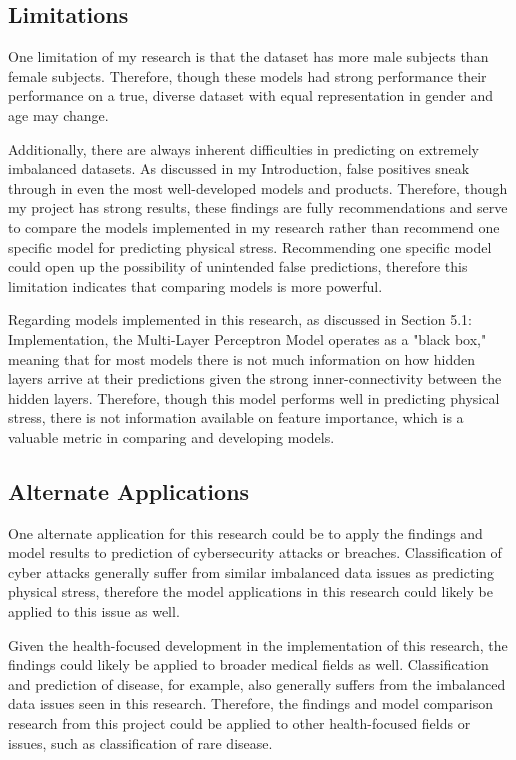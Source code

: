 \documentclass{article}
\begin{document}
\subsection{Limitations}

One limitation of my research is that the dataset has more male subjects than female subjects. Therefore, though these models had strong performance their performance on a true, diverse dataset with equal representation in gender and age may change. 

Additionally, there are always inherent difficulties in predicting on extremely imbalanced datasets. As discussed in my Introduction, false positives sneak through in even the most well-developed models and products. Therefore, though my project has strong results, these findings are fully recommendations and serve to compare the models implemented in my research rather than recommend one specific model for predicting physical stress. Recommending one specific model could open up the possibility of unintended false predictions, therefore this limitation indicates that comparing models is more powerful. 

Regarding models implemented in this research, as discussed in Section 5.1: Implementation, the Multi-Layer Perceptron Model operates as a "black box," meaning that for most models there is not much information on how hidden layers arrive at their predictions given the strong inner-connectivity between the hidden layers. Therefore, though this model performs well in predicting physical stress, there is not information available on feature importance, which is a valuable metric in comparing and developing models. 

\subsection{Alternate Applications}

One alternate application for this research could be to apply the findings and model results to prediction of cybersecurity attacks or breaches. Classification of cyber attacks generally suffer from similar imbalanced data issues as predicting physical stress, therefore the model applications in this research could likely be applied to this issue as well. 

Given the health-focused development in the implementation of this research, the findings could likely be applied to broader medical fields as well. Classification and prediction of disease, for example, also generally suffers from the imbalanced data issues seen in this research. Therefore, the findings and model comparison research from this project could be applied to other health-focused fields or issues, such as classification of rare disease.
\end{document}
